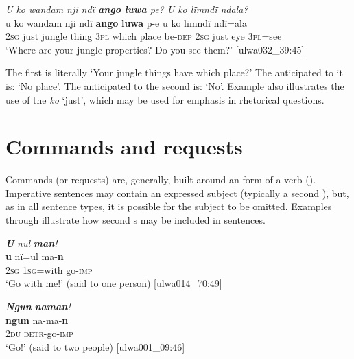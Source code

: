 \ea%
    \label{ex:syntax:66}
          \textit{U ko wandam nji ndï \textbf{ango luwa} pe? U ko lïmndï ndala?}\\
\gll    u    ko  wandam  nji    ndï  \textbf{ango}  \textbf{luwa}  p-e    u    ko     lïmndï  ndï=ala\\
    2\textsc{sg}  just  jungle    thing  3\textsc{pl}  which  place  be\textsc{{}-dep}  \textsc{2sg} just    eye    3\textsc{pl}=see\\
\glt `Where are your jungle properties? Do you see them?’ [ulwa032\_39:45]
\z

The first  is literally ‘Your jungle things have which place?’ The anticipated  to it is: ‘No place’. The anticipated  to the second  is: ‘No’. Example  also illustrates the use of the  \textit{ko} ‘just’, which may be used for emphasis in rhetorical questions.


\section{Commands and requests}\label{sec:13.2}


Commands (or requests) are, generally, built around an  form of a verb (). Imperative sentences may contain an expressed subject (typically a second  ), but, as in all sentence types, it is possible for the subject to be omitted. Examples  through  illustrate how second  s may be included in  sentences.

\ea%
    \label{ex:syntax:67}
          \textbf{\textit{U}} \textit{nul} \textbf{\textit{man}}\textit{!}\\
\gll    \textbf{u}    nï=ul    ma-\textbf{n}\\
    2\textsc{sg}  1\textsc{sg}=with  go-\textsc{imp}\\
\glt `Go with me!’ (said to one person) [ulwa014\_70:49]
\z

\ea%
    \label{ex:syntax:68}
          \textbf{\textit{Ngun}} \textbf{\textit{naman}}\textit{!}\\
\gll    \textbf{ngun}  na-ma-\textbf{n}\\
    2\textsc{du}  \textsc{detr-}go-\textsc{imp}\\
\glt `Go!’ (said to two people) [ulwa001\_09:46]
\z

